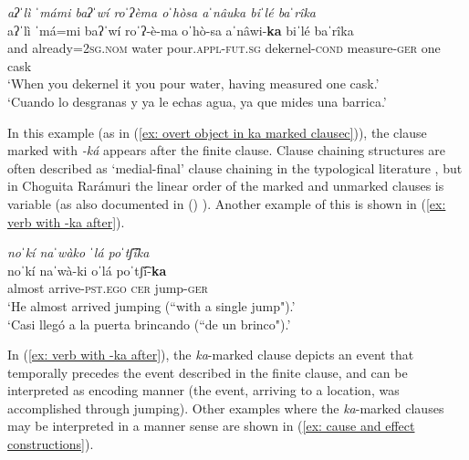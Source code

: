 \ea\label{ex: non-coreferential objects}

    \textit{aʔˈlì ˈmámi baʔˈwí roˈʔèma oˈhòsa aˈnâuka biˈlé baˈrîka}\\
    \gll    aʔˈlì ˈmá=mi baʔˈwí roˈʔ-è-ma oˈhò-sa aˈnâwi-\textbf{ka} biˈlé baˈrîka\\
            and already=\textsc{2sg.nom} water pour.\textsc{appl-fut.sg} dekernel-\textsc{cond}  measure-\textsc{{ger}} one cask\\
    \glt    `When you dekernel it you pour water, having measured one cask.’\\
    \glt    `Cuando lo desgranas y ya le echas agua, ya que mides una barrica.’  \\

\z

In this example (as in (\ref{ex: overt object in ka marked clausec})), the clause marked with \textit{-ká} appears after the finite clause. Clause chaining structures are often described as `medial-final' clause chaining in the typological literature \citep{longacre2007sentences}, but in Choguita Rarámuri the linear order of the marked and unmarked clauses is variable (as also documented in  () \citep{toosarvandani2016temporal}). Another example of this is shown in (\ref{ex: verb with -ka after}).

\ea\label{ex: verb with -ka after}

    \textit{noˈkí naˈwàko ˈlá poˈtʃ͡íka}\\
    \gll    noˈkí naˈwà-ki oˈlá poˈtʃ͡í-\textbf{ka}\\
            almost arrive-\textsc{pst.ego} \textsc{cer} jump-\textsc{{ger}}\\
    \glt    `He almost arrived jumping (``with a single jump").'\\
    \glt    `Casi llegó a la puerta brincando (``de un brinco").’    \\

\z

In (\ref{ex: verb with -ka after}), the \textit{ka}-marked clause depicts an event that temporally precedes the event described in the finite clause, and can be interpreted as encoding manner (the event, arriving to a location, was accomplished through jumping). Other examples where the \textit{ka}-marked clauses may be interpreted in a manner sense are shown in (\ref{ex: cause and effect constructions}).

